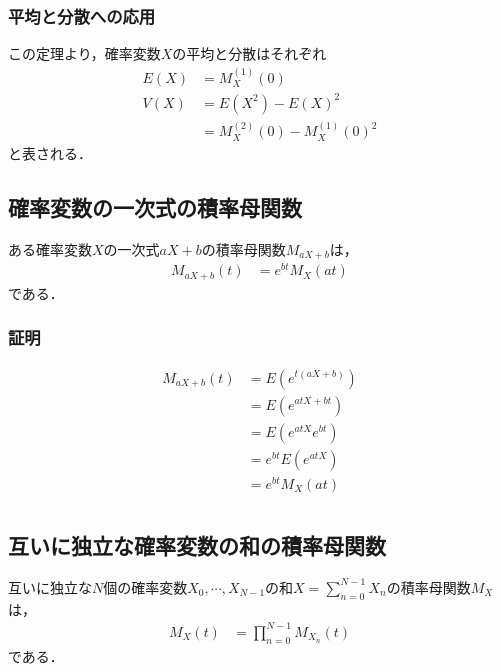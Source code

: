 \documentclass[dvipdfmx]{jsarticle}
\begin{document}
 \subsubsection{平均と分散への応用}
この定理より，確率変数$X$の平均と分散はそれぞれ
 \begin{align}
  E\left(X\right)&=M_X^{\left(1\right)}\left(0\right)\\
  V\left(X\right)&=E\left(X^2\right)-E\left(X\right)^2\nonumber\\
  &=M_X^{\left(2\right)}\left(0\right)-M_X^{\left(1\right)}\left(0\right)^2
 \end{align}
と表される．
 \subsection{確率変数の一次式の積率母関数}
ある確率変数$X$の一次式$aX+b$の積率母関数$M_{aX+b}$は，
 \begin{align}
  M_{aX+b}\left(t\right)&=e^{bt}M_X\left(at\right)
 \end{align}
である．
 \subsubsection{証明}
 \begin{align}
  M_{aX+b}\left(t\right)&=E\left(e^{t\left(aX+b\right)}\right)\nonumber\\
  &=E\left(e^{atX+bt}\right)\nonumber\\
  &=E\left(e^{atX}e^{bt}\right)\nonumber\\
  &=e^{bt}E\left(e^{atX}\right)\nonumber\\
  &=e^{bt}M_X\left(at\right)\nonumber\\
 \end{align}
 \subsection{互いに独立な確率変数の和の積率母関数}
互いに独立な$N$個の確率変数$X_0,\cdots,X_{N-1}$の和$X=\sum_{n=0}^{N-1}X_n$の積率母関数$M_X$は，
 \begin{align}
  M_X\left(t\right)&=\prod_{n=0}^{N-1}M_{X_n}\left(t\right)
 \end{align}
である．
\end{document}
